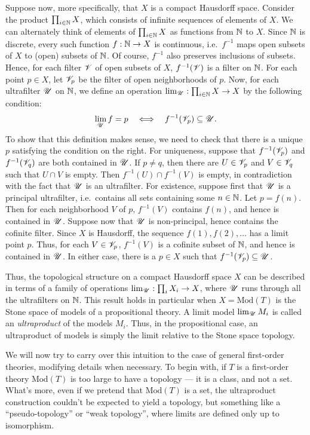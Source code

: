 Suppose now, more specifically, that $X$ is a compact Hausdorff space.
Consider the product $\prod _{i\in\mathbb N}X$, which consists of infinite
sequences of elements of $X$.  We can alternately think of elements of
$\prod _{i\in\mathbb N}X$ as functions from $\mathbb N$ to $X$.  Since $\mathbb N$ is
discrete, every such function $f:\mathbb N\to X$ is continuous, i.e.\
$f^{-1}$ maps open subsets of $X$ to (open) subsets of $\mathbb N$.  Of
course, $f^{-1}$ also preserves inclusions of subsets.  Hence, for
each filter $\mathscr V$ of open subsets of $X$, $f^{-1}(\mathscr V )$ is a filter
on $\mathbb N$.  For each point $p\in X$, let $\mathscr V _p$ be the filter of open
neighborhoods of $p$.  Now, for each ultrafilter $\mathscr U$ on $\mathbb N$, we
define an operation $\lim _{\mathscr U}:\prod _{i\in\mathbb N}X\to X$ by the
following condition:
\[ \lim _{\mathscr U}f =p \quad \Longleftrightarrow \quad f^{-1}(\mathscr V
  _p)\subseteq \mathscr U . \] To show that this definition makes sense, we
need to check that there is a unique $p$ satisfying the condition on
the right.  For uniqueness, suppose that $f^{-1}(\mathscr V _p )$ and
$f^{-1}(\mathscr V _q)$ are both contained in $\mathscr U$.  If $p\neq q$, then
there are $U\in \mathscr V _p$ and $V\in \mathscr V _q$ such that $U\cap V$ is
empty.  Then $f^{-1}(U)\cap f^{-1}(V)$ is empty, in contradiction with
the fact that $\mathscr U$ is an ultrafilter.  For existence, suppose first
that $\mathscr U$ is a principal ultrafilter, i.e.\ contains all sets
containing some $n\in \mathbb N$.  Let $p=f(n)$.  Then for each neighborhood
$V$ of $p$, $f^{-1}(V)$ contains $f(n)$, and hence is contained in
$\mathscr U$.  Suppose now that $\mathscr U$ is non-principal, hence contains the
cofinite filter.  Since $X$ is Hausdorff, the sequence
$f(1),f(2),\dots $ has a limit point $p$.  Thus, for each
$V\in\mathscr V _p$, $f^{-1}(V)$ is a cofinite subset of $\mathbb N$, and hence is
contained in $\mathscr U$.  In either case, there is a $p\in X$ such that
$f^{-1}(\mathscr V _p)\subseteq \mathscr U$.

Thus, the topological structure on a compact Hausdorff space $X$ can
be described in terms of a family of operations
$\lim _{\mathscr U}:\prod _iX_i\to X$, where $\mathscr U$ runs through all the
ultrafilters on $\mathbb N$.  This result holds in particular when
$X=\mathrm{Mod}(T)$ is the Stone space of models of a propositional
theory.  A limit model $\lim _{\mathscr U}M_i$ is called an
\emph{ultraproduct} of the models $M_i$.  Thus, in the propositional
case, an ultraproduct of models is simply the limit relative to the
Stone space topology.

We will now try to carry over this intuition to the case of general
first-order theories, modifying details when necessary.  To begin
with, if $T$ is a first-order theory $\mathrm{Mod}(T)$ is too large to
have a topology --- it is a class, and not a set.  What's more, even
if we pretend that $\mathrm{Mod}(T)$ is a set, the ultraproduct
construction couldn't be expected to yield a topology, but something
like a ``pseudo-topology'' or ``weak topology'', where limits are
defined only up to isomorphism.

